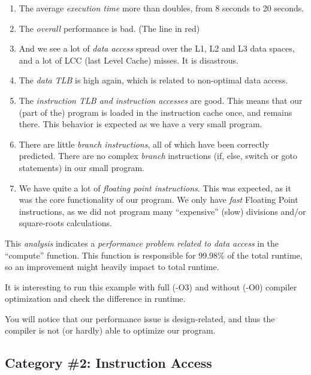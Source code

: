 \begin{enumerate}
  \item The average \emph{execution time} more than doubles, from 8 seconds to 20 seconds.
  \item The \emph{overall} performance is bad. (The line in red)
  \item And we see a lot of \emph{data access} spread over the L1, L2 and L3 data spaces, and a lot of LCC (last Level Cache) misses. It is disastrous.
  \item The \emph{data TLB} is high again, which is related to non-optimal data access.
  \item The \emph{instruction TLB and instruction accesses} are good. This means that our (part of the) program is loaded in the instruction cache once, and remains there. This behavior is expected as we have a very small program.
  \item There are little \emph{branch instructions}, all of which have been correctly predicted. There are no complex \emph{branch} instructions (if, else, switch or goto statements) in our small program.
  \item We have quite a lot of \emph{floating point instructions}. This was expected, as it was the core functionality of our program. We only have \emph{fast} Floating Point instructions, as we did not program many ``expensive'' (slow) divisions and/or square-roots calculations.
\end{enumerate}

This \emph{analysis} indicates a \emph{performance problem related to data access} in the ``compute'' function. This function is responsible for 99.98\% of the total runtime, so an improvement might heavily impact to total runtime.

\begin{tip}
It is interesting to run this example with full (-O3) and without (-O0) compiler optimization and check the difference in runtime.
\end{tip}

\begin{prompt}
\end{prompt}

You will notice that our performance issue is design-related, and thus the compiler is not (or hardly) able to optimize our program.

\subsection{Category \#2: Instruction Access}
\label{subsec:CAT2_Instruction_Access}

